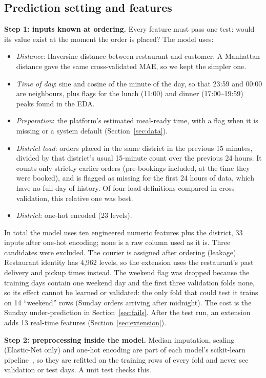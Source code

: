 \subsection{Prediction setting and features}
\textbf{Step 1: inputs known at ordering.} Every feature must pass one test: would its value exist at
the moment the order is placed? The model uses:
\begin{itemize}
  \item \emph{Distance}: Haversine distance between restaurant and customer. A Manhattan distance gave
        the same cross-validated MAE, so we kept the simpler one.
  \item \emph{Time of day}: sine and cosine of the minute of the day, so that 23:59 and 00:00 are
        neighbours, plus flags for the lunch (11:00) and dinner (17:00--19:59) peaks found in the EDA.
  \item \emph{Preparation}: the platform's estimated meal-ready time, with a flag when it is missing or
        a system default (Section~\ref{sec:data}).
  \item \emph{District load}: orders placed in the same district in the previous 15 minutes, divided by
        that district's usual 15-minute count over the previous 24 hours. It counts only strictly earlier
        orders (pre-bookings included, at the time they were booked), and is flagged as missing for the
        first 24 hours of data, which have no full day of history. Of four load definitions compared in
        cross-validation, this relative one was best.
  \item \emph{District}: one-hot encoded (23 levels).
\end{itemize}
In total the model uses ten engineered numeric features plus the district, 33 inputs after one-hot
encoding; none is a raw column used as it is.
Three candidates were excluded. The courier is assigned after ordering (leakage). Restaurant identity
has 4{,}962 levels, so the extension uses the restaurant's past delivery and pickup times instead. The
weekend flag was dropped because the training days contain one weekend day and the first three
validation folds none, so its effect cannot be learned or validated: the only fold that could test it
trains on 14 ``weekend'' rows (Sunday orders arriving after midnight). The cost is the Sunday
under-prediction in Section~\ref{sec:fails}. After the test run, an extension adds 13 real-time features
(Section~\ref{sec:extension}).

\textbf{Step 2: preprocessing inside the model.} Median imputation, scaling (Elastic-Net only) and
one-hot encoding are part of each model's scikit-learn pipeline~\cite{pedregosa2011scikit}, so they are
refitted on the training rows of every fold and never see validation or test days. A unit test checks
this.

